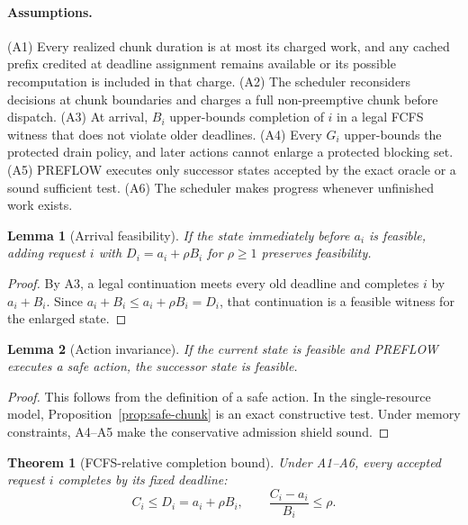 \documentclass{article}
\newtheorem{lemma}{Lemma}
\newtheorem{theorem}{Theorem}
\newcommand{\preflow}{\textnormal{\textsc{PREFLOW}}}
\begin{document}
\paragraph{Assumptions.}
(A1) Every realized chunk duration is at most its charged work, and any cached
prefix credited at deadline assignment remains available or its possible
recomputation is included in that charge.
(A2) The scheduler reconsiders decisions at chunk boundaries and charges a full
non-preemptive chunk before dispatch.
(A3) At arrival, $B_i$ upper-bounds completion of $i$ in a legal FCFS witness
that does not violate older deadlines.
(A4) Every $G_i$ upper-bounds the protected drain policy, and later actions
cannot enlarge a protected blocking set.
(A5) \preflow{} executes only successor states accepted by the exact oracle or
a sound sufficient test.
(A6) The scheduler makes progress whenever unfinished work exists.

\begin{lemma}[Arrival feasibility]
\label{lem:arrival}
If the state immediately before $a_i$ is feasible, adding request $i$ with
$D_i=a_i+\rho B_i$ for $\rho\geq1$ preserves feasibility.
\end{lemma}

\begin{proof}
By A3, a legal continuation meets every old deadline and completes $i$ by
$a_i+B_i$.  Since $a_i+B_i\leq a_i+\rho B_i=D_i$, that continuation is a
feasible witness for the enlarged state.
\end{proof}

\begin{lemma}[Action invariance]
\label{lem:action}
If the current state is feasible and \preflow{} executes a safe action, the
successor state is feasible.
\end{lemma}

\begin{proof}
This follows from the definition of a safe action.  In the single-resource
model, Proposition~\ref{prop:safe-chunk} is an exact constructive test.  Under
memory constraints, A4--A5 make the conservative admission shield sound.
\end{proof}

\begin{theorem}[FCFS-relative completion bound]
\label{thm:bound}
Under A1--A6, every accepted request $i$ completes by its fixed deadline:
\begin{equation}
    C_i\leq D_i=a_i+\rho B_i,
    \qquad
    \frac{C_i-a_i}{B_i}\leq\rho.
    \label{eq:main-bound}
\end{equation}
\end{theorem}
\end{document}

